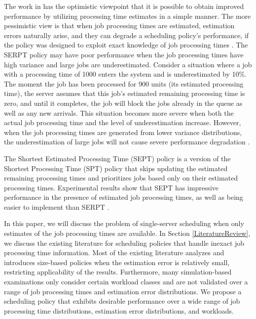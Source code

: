 The work in \cite{mitzenmacher2019scheduling} has the optimistic viewpoint that it is possible to obtain improved performance by utilizing processing time estimates in a simple manner. The more pessimistic view is that when job processing times are estimated, estimation errors naturally arise, and they can degrade a scheduling policy's performance, if the policy was designed to exploit exact knowledge of job processing times \cite{lu2004size}. The SERPT policy may have poor performance when the job processing times have high variance and large jobs are underestimated. Consider a situation where a job with a processing time of 1000 enters the system and is underestimated by 10\%. The moment the job has been processed for 900 units (its estimated processing time), the server assumes that this job's estimated remaining processing time is zero, and until it completes, the job will block the jobs already in the queue as well as any new arrivals. This situation becomes more severe when both the actual job processing time and the level of underestimation increase. However, when the job processing times are generated from lower variance distributions, the underestimation of large jobs will not cause severe performance degradation \cite{mailach2017robustness}.


The Shortest Estimated Processing Time (SEPT) policy is a version of the Shortest Processing Time (SPT) policy that skips updating the estimated remaining processing times and prioritizes jobs based only on their estimated processing times. Experimental results show that SEPT has impressive performance in the presence of estimated job processing times, as well as being easier to implement than SERPT \cite{dell2019scheduling}. 

In this paper, we will discuss the problem of single-server scheduling when only estimates of the job processing times are available. In Section \ref{LiteratureReview}, we discuss the existing literature for scheduling policies that handle inexact job processing time information. Most of the existing literature analyzes and introduces size-based policies when the estimation error is relatively small, restricting applicability of the results. Furthermore, many simulation-based examinations only consider certain workload classes and are not validated over a range of job processing times and estimation error distributions. We propose a scheduling policy that exhibits desirable performance over a wide range of job processing time distributions, estimation error distributions, and workloads. 



